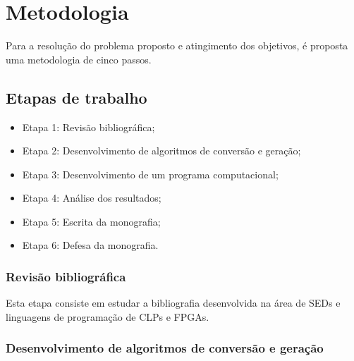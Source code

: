
\chapter{Metodologia}





Para a resolu\c{c}\~ao do problema proposto e atingimento dos objetivos, \'e proposta uma metodologia de cinco passos.




\section{Etapas de trabalho}

\begin{itemize}
	\item Etapa 1: Revis\~ao bibliogr\'afica;
	\item Etapa 2: Desenvolvimento de algoritmos de convers\~ao e gera\c{c}\~ao;
	\item Etapa 3: Desenvolvimento de um programa computacional;
	\item Etapa 4: An\'alise dos resultados;
	\item Etapa 5: Escrita da monografia;
	\item Etapa 6: Defesa da monografia.
\end{itemize}

\subsection{Revis\~ao bibliogr\'afica}

Esta etapa consiste em estudar a bibliografia desenvolvida na \'area de SEDs e linguagens de programa\c{c}\~ao de CLPs e FPGAs.

\subsection{Desenvolvimento de algoritmos de convers\~ao e gera\c{c}\~ao} 

